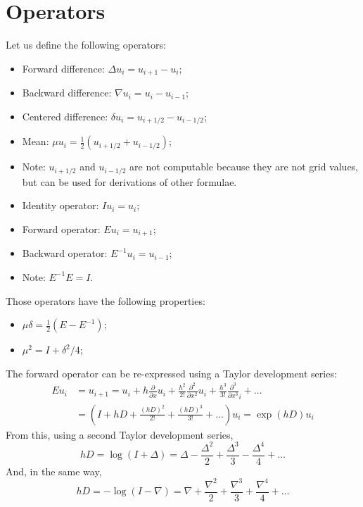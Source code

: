 \documentclass[12pt, openany]{report}
\theoremstyle{definition}
\begin{document}
\section{Operators}
Let us define the following operators:
\begin{itemize}
	\item Forward difference: $\Delta u_i = u_{i+1} - u_i$;
	\item Backward difference: $\nabla u_i = u_{i}-u_{i-1}$;
	\item Centered difference: $\delta u_i = u_{i+1/2}-u_{i-1/2}$;
	\item Mean: $\mu u_i = \frac{1}{2}(u_{i+1/2}+u_{i-1/2})$;
	\item [$\to$] Note: $u_{i+1/2}$ and $u_{i-1/2}$ are not computable because they are not grid values, but can be used for derivations of other formulae.
	\item Identity operator: $Iu_i = u_i$;
	\item Forward operator: $Eu_i = u_{i+1}$;
	\item Backward operator: $E^{-1}u_i = u_{i-1}$;
	\item [$\to$] Note: $E^{-1} E = I$.
\end{itemize}
Those operators have the following properties:
\begin{itemize}
	\item $\mu \delta = \frac{1}{2}(E-E^{-1})$;
	\item $\mu^2 = I+\delta^2/4$;
\end{itemize}
The forward operator can be re-expressed using a Taylor development series:
\begin{equation}
	\begin{aligned}
		Eu_i &= u_{i+1} = u_i + h\frac{\partial }{\partial x} u_i + \frac{h^2}{2!} \frac{\partial^2}{\partial x^2} u_i + \frac{h^3}{3!} \frac{\partial^3}{\partial x^3}_i + \dots \\
		&= \left(I+hD+\frac{(hD)^2}{2!} + \frac{(hD)^3}{3!} + \dots\right)u_i = \exp(hD)u_i
	\end{aligned}
\end{equation}
From this, using a second Taylor development series,
\begin{equation}
	hD = \log(I+\Delta) = \Delta - \frac{\Delta^2}{2} + \frac{\Delta^3}{3} - \frac{\Delta^4}{4} + \dots 
\end{equation}
And, in the same way, 
\begin{equation}
	hD = -\log (I-\nabla) = \nabla + \frac{\nabla^2}{2} + \frac{\nabla^3}{3} + \frac{\nabla^4}{4} + \dots 
\end{equation}
\end{document}
